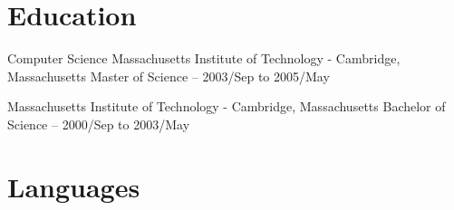 \documentclass{leancv}
\begin{document}
\begin{leancv}
\section{Education}

\educationentry
	{Computer Science}
	{Massachusetts Institute of Technology - Cambridge, Massachusetts}
	{Master of Science – 2003/Sep to 2005/May}

	{Massachusetts Institute of Technology - Cambridge, Massachusetts}
	{Bachelor of Science – 2000/Sep to 2003/May}


\section{Languages}


\end{leancv}
\end{document}
